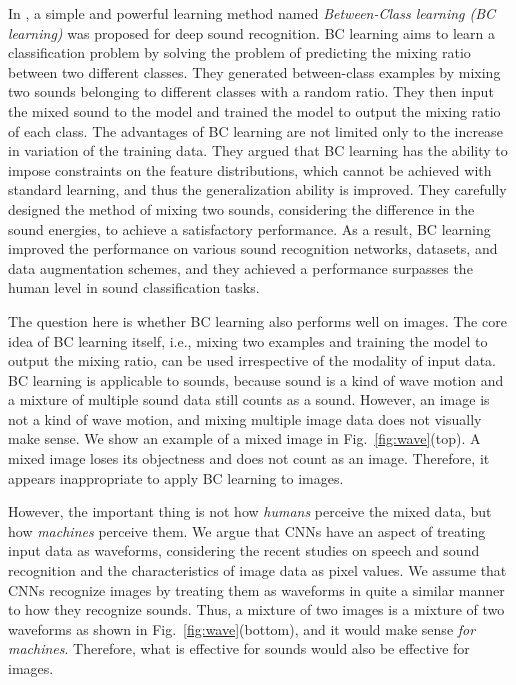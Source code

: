 \documentclass[10pt,twocolumn,letterpaper]{article}
\begin{document}
In \cite{tokozume2018learning}, a simple and powerful learning method named {\it Between-Class learning (BC learning)} was proposed for deep sound recognition. BC learning aims to learn a classification problem by solving the problem of predicting the mixing ratio between two different classes. They generated between-class examples by mixing two sounds belonging to different classes with a random ratio. They then input the mixed sound to the model and trained the model to output the mixing ratio of each class. The advantages of BC learning are not limited only to the increase in variation of the training data. They argued that BC learning has the ability to impose constraints on the feature distributions, which cannot be achieved with standard learning, and thus the generalization ability is improved. They carefully designed the method of mixing two sounds, considering the difference in the sound energies, to achieve a satisfactory performance. As a result, BC learning improved the performance on various sound recognition networks, datasets, and data augmentation schemes, and they achieved a performance surpasses the human level in sound classification tasks.

The question here is whether BC learning also performs well on images. The core idea of BC learning itself, i.e., mixing two examples and training the model to output the mixing ratio, can be used irrespective of the modality of input data. BC learning is applicable to sounds, because sound is a kind of wave motion and a mixture of multiple sound data still counts as a sound. However, an image is not a kind of wave motion, and mixing multiple image data does not visually make sense. We show an example of a mixed image in Fig.~\ref{fig:wave}(top). A mixed image loses its objectness and does not count as an image. Therefore, it appears inappropriate to apply BC learning to images.

However, the important thing is not how {\it humans} perceive the mixed data, but how {\it machines} perceive them. We argue that CNNs have an aspect of treating input data as waveforms, considering the recent studies on speech and sound recognition and the characteristics of image data as pixel values. We assume that CNNs recognize images by treating them as waveforms in quite a similar manner to how they recognize sounds. Thus, a mixture of two images is a mixture of two waveforms as shown in Fig.~\ref{fig:wave}(bottom), and it would make sense {\it for machines}. Therefore, what is effective for sounds would also be effective for images.
\end{document}
